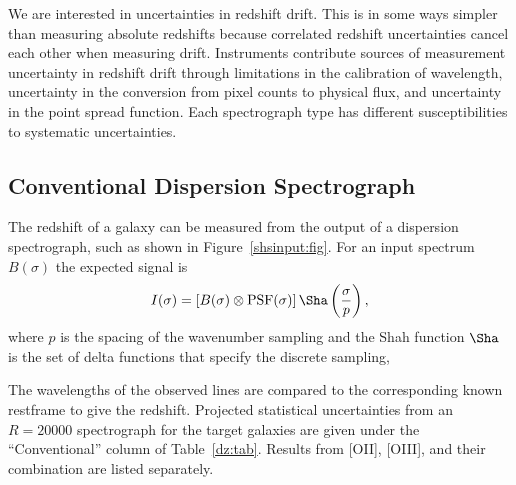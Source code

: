 \documentclass[preprint2, 10pt]{aastex}
\begin{document}
We are interested in uncertainties in redshift drift.  This is in some ways simpler than measuring absolute redshifts
because correlated redshift uncertainties cancel each other when measuring drift.
Instruments contribute sources of measurement uncertainty in redshift drift through limitations in the calibration
of wavelength,  uncertainty in the conversion from pixel counts to physical flux, and uncertainty in the point spread function. 
Each spectrograph type
has different susceptibilities to systematic uncertainties.


\subsection{Conventional Dispersion Spectrograph} 

The redshift of a galaxy can be measured from the output of a dispersion spectrograph, such as shown in Figure~\ref{shsinput:fig}.
For an input spectrum $B(\sigma)$ the expected signal is
\begin{equation}
I(\sigma) = \left[B(\sigma)\otimes \mbox{PSF}(\sigma)\right]\Sha\left(\frac{\sigma}{p}\right),
\label{conventional:eqn}
\end{equation}
where $p$ is the spacing of the wavenumber sampling and the Shah function $\Sha$ is the set of delta functions
that specify the discrete sampling,

The wavelengths of the observed lines are compared to the corresponding known restframe to give
the redshift.
Projected statistical uncertainties from an $R=20000$ spectrograph for the target galaxies are given under
the ``Conventional'' column of Table~\ref{dz:tab}.  Results from [OII], [OIII], and their combination are listed separately.
\end{document}
